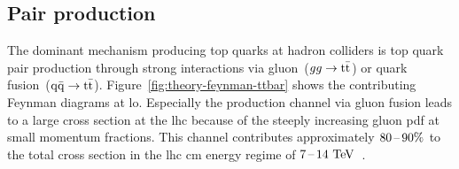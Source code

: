\subsection{Pair production}

The dominant mechanism producing top quarks at hadron colliders is top quark pair production through strong interactions via gluon~($gg\to\mathrm{t}\bar{\mathrm{t}}$) or quark fusion~($\mathrm{q}\bar{\mathrm{q}}\to\mathrm{t}\bar{\mathrm{t}}$). Figure~\ref{fig:theory-feynman-ttbar} shows the contributing Feynman diagrams at \gls{lo}. Especially the production channel via gluon fusion leads to a large cross section at the \gls{lhc} because of the steeply increasing gluon \gls{pdf} at small momentum fractions. This channel contributes approximately $80\,\text{--}\,90\%$ to the total cross section in the \gls{lhc} \gls{cm} energy regime of $7\,\text{--}\,14~\mathrm{TeV}$~\cite{Olive:2016xmw}.


